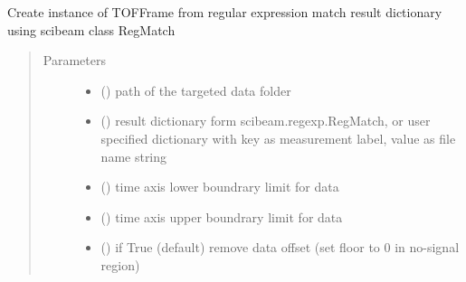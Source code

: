 \documentclass[letterpaper,10pt,english]{sphinxmanual}
\begin{document}
\begin{fulllineitems}
\label{\detokenize{scibeam.core:scibeam.core.tofframe.read_regexp_match}}
Create instance of TOFFrame from regular expression match result dictionary
using scibeam class RegMatch
\begin{quote}\begin{description}
\item[{Parameters}] \leavevmode\begin{itemize}
\item {} 
 () \textendash{} path of the targeted data folder

\item {} 
 () \textendash{} result dictionary form scibeam.regexp.RegMatch, or user specified
dictionary with key as measurement label, value as file name string

\item {} 
 () \textendash{} time axis lower boundrary limit for data

\item {} 
 () \textendash{} time axis upper boundrary limit for data

\item {} 
 () \textendash{} if True (default) remove data offset (set floor to 0 in no-signal region)


\end{itemize}
\end{description}
\end{quote}
\end{fulllineitems}
\end{document}

